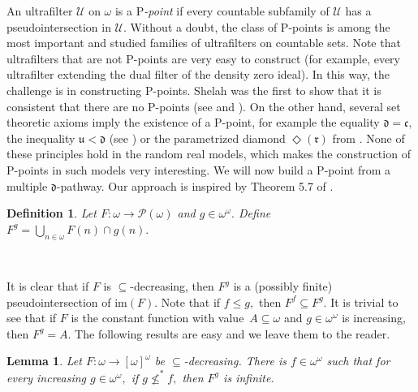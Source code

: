 \documentclass{article}%
\newtheorem{definition}[theorem]{Definition}
\newtheorem{lemma}[theorem]{Lemma}
\begin{document}
An ultrafilter $\mathcal{U}$ on $\omega$ is a \textsf{P}\emph{-point }if every
countable subfamily of $\mathcal{U}$ has a pseudointersection in
$\mathcal{U}.$ Without a doubt, the class of \textsf{P}-points is among the
most important and studied families of ultrafilters on countable sets. Note
that ultrafilters that are not \textsf{P}-points are very easy to construct
(for example, every ultrafilter extending the dual filter of the density zero
ideal). In this way, the challenge is in constructing \textsf{P}-points.
Shelah was the first to show that it is consistent that there are no
\textsf{P}-points (see \cite{Wimmers} and \cite{ProperandImproper}). On the
other hand, several set theoretic axioms imply the existence of a
\textsf{P}-point, for example the equality $\mathfrak{d=c},$ the inequality
$\mathfrak{u<d}$ (see \cite{HandbookBlass}) or the parametrized diamond
$\Diamond\left(  \mathfrak{r}\right)  $ from \cite{ParametrizedDiamonds}. None
of these principles hold in the random real models, which makes the
construction of \textsf{P}-points in such models very interesting. We will now
build a \textsf{P}-point from a multiple $\mathfrak{d}$-pathway. Our approach
is inspired by Theorem 5.7 of \cite{PFiltersCohenRandomLaver}.

\begin{definition}
Let $F:\omega\longrightarrow\mathcal{P}\left(  \omega\right)  $ and
$g\in\omega^{\omega}.$ Define $F^{g}=%
{\textstyle\bigcup\limits_{n\in\omega}}
F\left(  n\right)  \cap g\left(  n\right)  .$
\end{definition}

\qquad\qquad\ \ \ 

It is clear that if $F$ is $\subseteq$-decreasing, then $F^{g}$ is a (possibly
finite) pseudointersection of \textsf{im}$\left(  F\right)  .$ Note that if
$f\leq g,$ then $F^{f}\subseteq F^{g}.$ It is trivial to see that if $F$ is
the constant function with value\ $A\subseteq\omega$ and $g\in\omega^{\omega}$
is increasing, then $F^{g}=A.$ The following results are easy and we leave
them to the reader.

\begin{lemma}
Let $F:\omega\longrightarrow\left[  \omega\right]  ^{\omega}$ be $\subseteq
$-decreasing. There is $f\in\omega^{\omega}$ such that for every increasing
$g\in\omega^{\omega},$ if $g\nleq^{\ast}f,$ then $F^{g}$ is infinite.
\label{adecuada P punto}\qquad\ \ \qquad\ \ \ 
\end{lemma}
\end{document}
